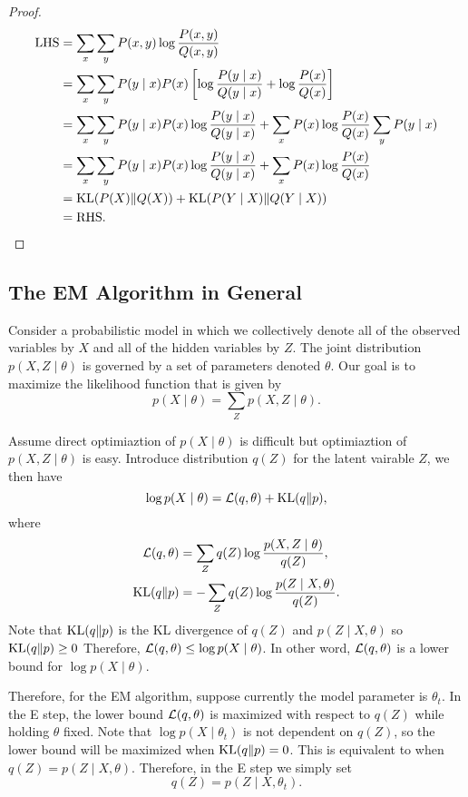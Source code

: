 \documentclass[a4paper]{article}
\begin{document}
\begin{proof}
\[
\begin{aligned}
  \text{LHS} &= \sum_x \sum_y P(x,y) \log \frac{P(x,y)}{Q(x,y)} \\
  &= \sum_x \sum_y P(y \mid x) P(x) \left[ \log 
  \frac{P(y \mid x)}{Q(y \mid x)} + \log \frac{P(x)}{Q(x)} \right] \\
  &= \sum_x \sum_y P(y \mid x) P(x) \log 
  \frac{P(y \mid x)}{Q(y \mid x)} + \sum_x P(x) \log 
  \frac{P(x)}{Q(x)} \sum_y P(y \mid x) \\
  &= \sum_x \sum_y P(y \mid x) P(x) \log \frac{P(y \mid x)}
  {Q(y \mid x)} + \sum_x P(x) \log \frac{P(x)}{Q(x)} \\
  &= \operatorname{KL}({P(X)} \Vert {Q(X)}) + \operatorname{KL}({P(Y \mid X)} \Vert {Q(Y \mid X)}) \\
  &= \text{RHS}.
\end{aligned}
\]
\end{proof}

\subsection{The EM Algorithm in General}

Consider a probabilistic model in which we collectively 
denote all of the observed variables by $X$ and all of 
the hidden variables by $Z$. The joint distribution 
$p(X, Z \mid \theta)$ is governed by a set of parameters 
denoted $\theta$. Our goal is to maximize the likelihood 
function that is given by
\[
p(X \mid \theta) = \sum_Z p(X, Z \mid \theta).
\]

Assume direct optimiaztion of $p(X \mid \theta)$ is difficult
but optimiaztion of $p(X, Z \mid \theta)$ is easy.
Introduce distribution $q(Z)$ for the latent vairable $Z$,
we then have 
\[
\log p(X \mid \theta) = \mathcal{L}(q, \theta) + \mathrm{KL}(q \Vert p),
\]
where 
\[
\begin{aligned}
  \mathcal{L}(q, \theta) &= \sum_Z q(Z) \log \frac{p(X, Z \mid \theta)}{q(Z)}, \\
  \mathrm{KL}(q \Vert p) &= - \sum_Z q(Z) \log \frac{p(Z \mid X, \theta)}{q(Z)}.
\end{aligned}
\]
Note that $\mathrm{KL}(q \Vert p)$ is the KL divergence of $q(Z)$
and $p(Z \mid X, \theta)$ so $\mathrm{KL}(q \Vert p) \geq 0$
Therefore, $\mathcal{L}(q, \theta) \leq \log p(X \mid \theta)$. In other word,
$\mathcal{L}(q, \theta)$ is a lower bound for $\log p(X \mid \theta)$.

Therefore, for the EM algorithm, suppose currently the model 
parameter is $\theta_t$. In the E step, the lower bound 
$\mathcal{L}(q, \theta)$ is maximized with respect to $q(Z)$ while 
holding $\theta$ fixed. Note that $\log p(X \mid \theta_t)$
is not dependent on $q(Z)$, so the lower bound will 
be maximized when $\mathrm{KL}(q \Vert p) = 0$. This is equivalent to
when $q(Z) = p(Z \mid X, \theta)$. Therefore, in the E 
step we simply set
\[
q(Z) = p(Z \mid X, \theta_t).
\]
\end{document}

